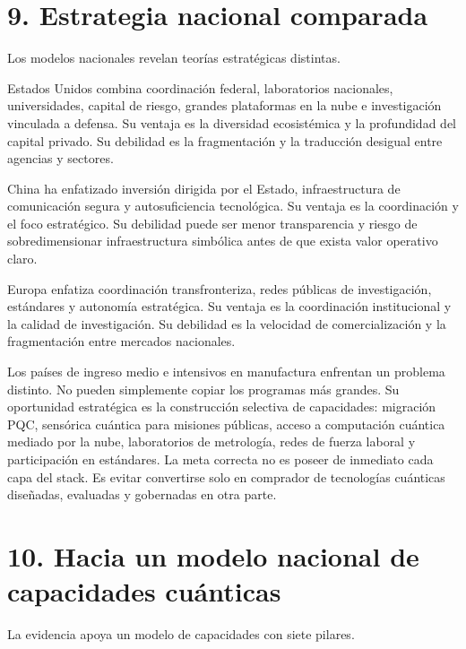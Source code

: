 \documentclass[
  11pt,
  letterpaper,
]{article}
\begin{document}
\section{9. Estrategia nacional
comparada}\label{estrategia-nacional-comparada}

Los modelos nacionales revelan teorías estratégicas distintas.

Estados Unidos combina coordinación federal, laboratorios nacionales,
universidades, capital de riesgo, grandes plataformas en la nube e
investigación vinculada a defensa. Su ventaja es la diversidad
ecosistémica y la profundidad del capital privado. Su debilidad es la
fragmentación y la traducción desigual entre agencias y sectores.

China ha enfatizado inversión dirigida por el Estado, infraestructura de
comunicación segura y autosuficiencia tecnológica. Su ventaja es la
coordinación y el foco estratégico. Su debilidad puede ser menor
transparencia y riesgo de sobredimensionar infraestructura simbólica
antes de que exista valor operativo claro.

Europa enfatiza coordinación transfronteriza, redes públicas de
investigación, estándares y autonomía estratégica. Su ventaja es la
coordinación institucional y la calidad de investigación. Su debilidad
es la velocidad de comercialización y la fragmentación entre mercados
nacionales.

Los países de ingreso medio e intensivos en manufactura enfrentan un
problema distinto. No pueden simplemente copiar los programas más
grandes. Su oportunidad estratégica es la construcción selectiva de
capacidades: migración PQC, sensórica cuántica para misiones públicas,
acceso a computación cuántica mediado por la nube, laboratorios de
metrología, redes de fuerza laboral y participación en estándares. La
meta correcta no es poseer de inmediato cada capa del stack. Es evitar
convertirse solo en comprador de tecnologías cuánticas diseñadas,
evaluadas y gobernadas en otra parte.

\section{10. Hacia un modelo nacional de capacidades
cuánticas}\label{hacia-un-modelo-nacional-de-capacidades-cuuxe1nticas}

La evidencia apoya un modelo de capacidades con siete pilares.
\end{document}
